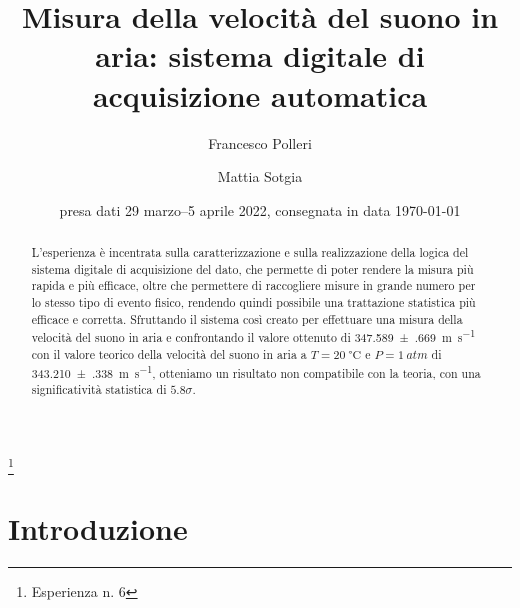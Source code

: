 \documentclass[
    prl,
    reprint, 
    superscriptaddress, 
    altaffilletter, 
    amsmath, 
    amssymb, 
    a4paper,
    varvw]{revtex4-2}
\begin{document}
\title{Misura della velocità del suono in aria: sistema digitale di acquisizione automatica
}
\thanks{Esperienza n. 6
}

\author{Francesco Polleri}
\author{Mattia Sotgia}


\date{presa dati
    29 marzo--5 aprile 2022, consegnata in data
    \today
}

\begin{abstract}
    L'esperienza è incentrata sulla caratterizzazione e sulla realizzazione della logica del sistema digitale di acquisizione del dato, che permette di poter rendere la misura più rapida e più efficace, oltre che permettere di raccogliere misure in grande numero per lo stesso tipo di evento fisico, rendendo quindi possibile una trattazione statistica più efficace e corretta. Sfruttando il sistema così creato per effettuare una misura della velocità del suono in aria e confrontando il valore ottenuto di \SI{347.589(669)}{\metre\per\second} con il valore teorico della velocità del suono in aria a $T=\SI{20}{\celsius}$ e $P=\SI{1}{atm}$ di \SI{343.210(338)}{\metre\per\second}, otteniamo un risultato non compatibile con la teoria, con una significatività statistica di $5.8\sigma$.
\end{abstract}

\maketitle
\thispagestyle{fancy}




\section{Introduzione}
\end{document}

